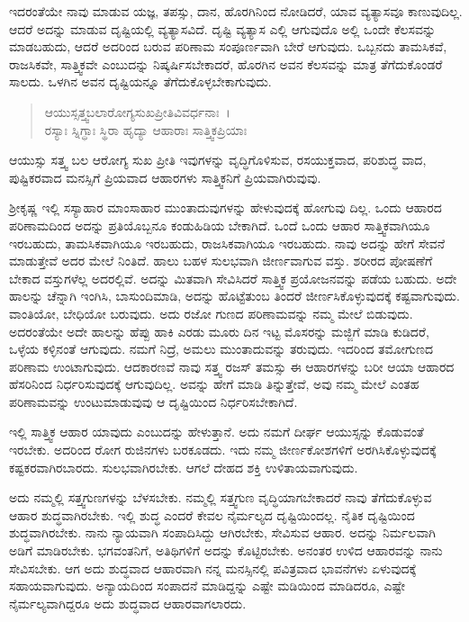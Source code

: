ಇದರಂತೆಯೇ ನಾವು ಮಾಡುವ ಯಜ್ಞ, ತಪಸ್ಸು, ದಾನ, ಹೊರಗಿನಿಂದ ನೋಡಿದರೆ, ಯಾವ ವ್ಯತ್ಯಾಸವೂ ಕಾಣುವುದಿಲ್ಲ. ಆದರೆ ಅದನ್ನು ಮಾಡುವ ದೃಷ್ಟಿಯಲ್ಲಿ ವ್ಯತ್ಯಾಸವಿದೆ. ದೃಷ್ಟಿ ವ್ಯತ್ಯಾಸ ಎಲ್ಲಿ ಆಗುವುದೊ ಅಲ್ಲಿ ಒಂದೇ ಕೆಲಸವನ್ನು ಮಾಡಬಹುದು, ಆದರೆ ಅದರಿಂದ ಬರುವ ಪರಿಣಾಮ ಸಂಪೂರ್ಣವಾಗಿ ಬೇರೆ ಆಗುವುದು. ಒಬ್ಬನದು ತಾಮಸಿಕವೆ, ರಾಜಸಿಕವೇ, ಸಾತ್ತ್ವಿಕವೇ ಎಂಬುದನ್ನು ನಿಷ್ಕರ್ಷಿಸಬೇಕಾದರೆ, ಹೊರಗಿನ ಅವನ ಕೆಲಸವನ್ನು ಮಾತ್ರ ತೆಗೆದುಕೊಂಡರೆ ಸಾಲದು. ಒಳಗಿನ ಅವನ ದೃಷ್ಟಿಯನ್ನೂ ತೆಗೆದುಕೊಳ್ಳಬೇಕಾಗುವುದು.

\begin{verse}
ಆಯುಸ್ಸತ್ತ್ವಬಲಾರೋಗ್ಯಸುಖಪ್ರೀತಿವಿವರ್ಧನಾಃ~।\\ರಸ್ಯಾಃ ಸ್ನಿಗ್ಧಾಃ ಸ್ಥಿರಾ ಹೃದ್ಯಾ ಆಹಾರಾಃ ಸಾತ್ತ್ವಿಕಪ್ರಿಯಾಃ 
\end{verse}

{\small ಆಯುಸ್ಸು ಸತ್ತ್ವ ಬಲ ಆರೋಗ್ಯ ಸುಖ ಪ್ರೀತಿ ಇವುಗಳನ್ನು ವೃದ್ಧಿಗೊಳಿಸುವ, ರಸಯುಕ್ತವಾದ, ಪರಿಶುದ್ಧ ವಾದ, ಪುಷ್ಟಿಕರವಾದ ಮನಸ್ಸಿಗೆ ಪ್ರಿಯವಾದ ಆಹಾರಗಳು ಸಾತ್ತ್ವಿಕನಿಗೆ ಪ್ರಿಯವಾಗಿರುವುವು.}

ಶ‍್ರೀಕೃಷ್ಣ ಇಲ್ಲಿ ಸಸ್ಯಾಹಾರ ಮಾಂಸಾಹಾರ ಮುಂತಾದುವುಗಳನ್ನು ಹೇಳುವುದಕ್ಕೆ ಹೋಗುವು ದಿಲ್ಲ. ಒಂದು ಆಹಾರದ ಪರಿಣಾಮದಿಂದ ಅದನ್ನು ಪ್ರತಿಯೊಬ್ಬನೂ ಕಂಡುಹಿಡಿಯ ಬೇಕಾಗಿದೆ. ಒಂದೆ ಒಂದು ಆಹಾರ ಸಾತ್ತ್ವಿಕವಾಗಿಯೂ ಇರಬಹುದು, ತಾಮಸಿಕವಾಗಿಯೂ ಇರಬಹುದು, ರಾಜಸಿಕವಾಗಿಯೂ ಇರಬಹುದು. ನಾವು ಅದನ್ನು ಹೇಗೆ ಸೇವನೆ ಮಾಡುತ್ತೇವೆ ಅದರ ಮೇಲೆ ನಿಂತಿದೆ. ಹಾಲು ಬಹಳ ಸುಲಭವಾಗಿ ಜೀರ್ಣವಾಗುವ ವಸ್ತು. ಶರೀರದ ಪೋಷಣೆಗೆ ಬೇಕಾದ ವಸ್ತುಗಳೆಲ್ಲ ಅದರಲ್ಲಿವೆ. ಅದನ್ನು ಮಿತವಾಗಿ ಸೇವಿಸಿದರೆ ಸಾತ್ತ್ವಿಕ ಪ್ರಯೋಜನವನ್ನು ಪಡೆಯ ಬಹುದು. ಅದೇ ಹಾಲನ್ನು ಚೆನ್ನಾಗಿ ಇಂಗಿಸಿ, ಬಾಸುಂದಿಮಾಡಿ, ಅದನ್ನು ಹೊಟ್ಟೆತುಂಬ ತಿಂದರೆ ಜೀರ್ಣಸಿಕೊಳ್ಳುವುದಕ್ಕೆ ಕಷ್ಟವಾಗುವುದು. ವಾಂತಿಯೋ, ಬೇಧಿಯೋ ಬರುವುದು. ಅದು ರಜೋ ಗುಣದ ಪರಿಣಾಮವನ್ನು ನಮ್ಮ ಮೇಲೆ ಬಿಡುವುದು. ಅದರಂತೆಯೇ ಅದೇ ಹಾಲನ್ನು ಹೆಪ್ಪು ಹಾಕಿ ಎರಡು ಮೂರು ದಿನ ಇಟ್ಟ ಮೊಸರನ್ನು ಮಜ್ಜಿಗೆ ಮಾಡಿ ಕುಡಿದರೆ, ಒಳ್ಳೆಯ ಕಳ್ಳಿನಂತೆ ಆಗುವುದು. ನಮಗೆ ನಿದ್ರೆ, ಅಮಲು ಮುಂತಾದುವನ್ನು ತರುವುದು. ಇದರಿಂದ ತಮೋಗುಣದ ಪರಿಣಾಮ ಉಂಟಾಗುವುದು. ಆದಕಾರಣವೆ ನಾವು ಸತ್ತ್ವ ರಜಸ್ ತಮಸ್ಸು ಈ ಆಹಾರಗಳನ್ನು ಬರೀ ಆಯಾ ಆಹಾರದ ಹೆಸರಿನಿಂದ ನಿರ್ಧರಿಸುವುದಕ್ಕೆ ಆಗುವುದಿಲ್ಲ. ಅವನ್ನು ಹೇಗೆ ಮಾಡಿ ತಿನ್ನುತ್ತೇವೆ, ಅವು ನಮ್ಮ ಮೇಲೆ ಎಂತಹ ಪರಿಣಾಮವನ್ನು ಉಂಟುಮಾಡುವುವು ಆ ದೃಷ್ಟಿಯಿಂದ ನಿರ್ಧರಿಸಬೇಕಾಗಿದೆ.

ಇಲ್ಲಿ ಸಾತ್ತ್ವಿಕ ಆಹಾರ ಯಾವುದು ಎಂಬುದನ್ನು ಹೇಳುತ್ತಾನೆ. ಅದು ನಮಗೆ ದೀರ್ಘ ಆಯುಸ್ಸನ್ನು ಕೊಡುವಂತೆ ಇರಬೇಕು. ಅದರಿಂದ ರೋಗ ರುಜಿನಗಳು ಬರಕೂಡದು. ಇದು ನಮ್ಮ ಜೀರ್ಣಕೋಶಗಳಿಗೆ ಅರಗಿಸಿಕೊಳ್ಳುವುದಕ್ಕೆ ಕಷ್ಟಕರವಾಗಿರಬಾರದು. ಸುಲಭವಾಗಿರಬೇಕು. ಆಗಲೆ ದೇಹದ ಶಕ್ತಿ ಉಳಿತಾಯವಾಗುವುದು.

ಅದು ನಮ್ಮಲ್ಲಿ ಸತ್ತ್ವಗುಣಗಳನ್ನು ಬೆಳಸಬೇಕು. ನಮ್ಮಲ್ಲಿ ಸತ್ತ್ವಗುಣ ವೃದ್ಧಿಯಾಗಬೇಕಾದರೆ ನಾವು ತೆಗೆದುಕೊಳ್ಳುವ ಆಹಾರ ಶುದ್ಧವಾಗಿರಬೇಕು. ಇಲ್ಲಿ ಶುದ್ಧ ಎಂದರೆ ಕೇವಲ ನೈರ್ಮಲ್ಯದ ದೃಷ್ಟಿಯಿಂದಲ್ಲ. ನೈತಿಕ ದೃಷ್ಟಿಯಿಂದ ಶುದ್ಧವಾಗಿರಬೇಕು. ನಾನು ನ್ಯಾಯವಾಗಿ ಸಂಪಾದಿಸಿದ್ದು ಆಗಿರಬೇಕು, ಸೇವಿಸುವ ಆಹಾರ. ಅದನ್ನು ನಿರ್ಮಲವಾಗಿ ಅಡಿಗೆ ಮಾಡಿರಬೇಕು. ಭಗವಂತನಿಗೆ, ಅತಿಥಿಗಳಿಗೆ ಅದನ್ನು ಕೊಟ್ಟಿರಬೇಕು. ಅನಂತರ ಉಳಿದ ಆಹಾರವನ್ನು ನಾನು ಸೇವಿಸಬೇಕು. ಆಗ ಅದು ಶುದ್ಧವಾದ ಆಹಾರವಾಗಿ ನನ್ನ ಮನಸ್ಸಿನಲ್ಲಿ ಪವಿತ್ರವಾದ ಭಾವನೆಗಳು ಏಳುವುದಕ್ಕೆ ಸಹಾಯವಾಗುವುದು. ಅನ್ಯಾಯದಿಂದ ಸಂಪಾದನೆ ಮಾಡಿದ್ದನ್ನು ಎಷ್ಟೇ ಮಡಿಯಿಂದ ಮಾಡಿದರೂ, ಎಷ್ಟೇ ನೈರ್ಮಲ್ಯವಾಗಿದ್ದರೂ ಅದು ಶುದ್ಧವಾದ ಆಹಾರವಾಗಲಾರದು.


